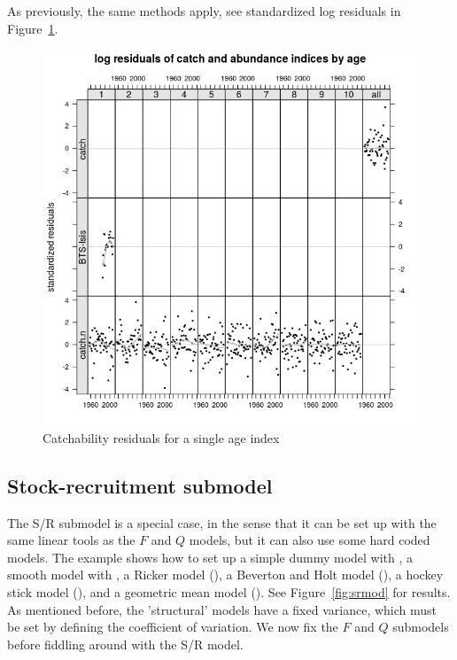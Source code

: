 \documentclass[a4paper,english,10pt]{article}\usepackage[]{graphicx}\usepackage[]{color}
\newenvironment{knitrout}{}{} %
\begin{document}
As previously, the same methods apply, see standardized log residuals in Figure~\ref{fig:resrec}.

\begin{knitrout}
\color{fgcolor}\begin{figure}[H]

{\centering \includegraphics[width=.9\linewidth]{figure/resrec-1} 

}

\caption[Catchability residuals for a single age index]{Catchability residuals for a single age index}\label{fig:resrec}
\end{figure}


\end{knitrout}

\subsection{Stock-recruitment submodel}

The S/R submodel is a special case, in the sense that it can be set up with the same linear tools as the $F$ and $Q$ models, but it can also use some hard coded models. The example shows how to set up a simple dummy model with , a smooth model with , a Ricker model (), a Beverton and Holt model (), a hockey stick model (), and a geometric mean model (). See Figure~\ref{fig:srmod} for results. As mentioned before, the 'structural' models have a fixed variance, which must be set by defining the coefficient of variation. We now fix the $F$ and $Q$ submodels before fiddling around with the S/R model.
\end{document}
